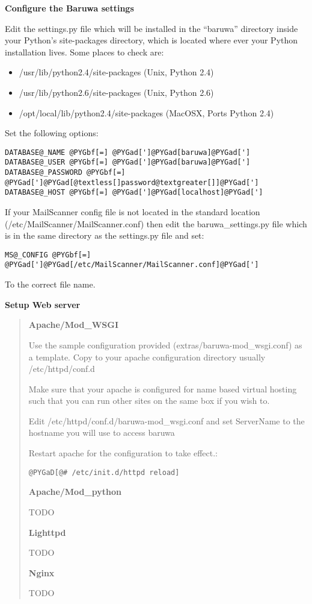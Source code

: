 \documentclass[a4paper,10pt,english]{manual}
\begin{document}
\textbf{Configure the Baruwa settings}

Edit the settings.py file which will be installed in the ``baruwa''
directory inside your Python's site-packages directory, which is
located where ever your Python installation lives. Some places
to check are:
\begin{itemize}
\item {} 
/usr/lib/python2.4/site-packages (Unix, Python 2.4)

\item {} 
/usr/lib/python2.6/site-packages (Unix, Python 2.6)

\item {} 
/opt/local/lib/python2.4/site-packages (MacOSX, Ports Python 2.4)

\end{itemize}

Set the following options:

\begin{Verbatim}[commandchars=@\[\]]
DATABASE@_NAME @PYGbf[=] @PYGad[']@PYGad[baruwa]@PYGad[']
DATABASE@_USER @PYGbf[=] @PYGad[']@PYGad[baruwa]@PYGad[']
DATABASE@_PASSWORD @PYGbf[=] @PYGad[']@PYGad[@textless[]password@textgreater[]]@PYGad[']
DATABASE@_HOST @PYGbf[=] @PYGad[']@PYGad[localhost]@PYGad[']
\end{Verbatim}

If your MailScanner config file is not located in the standard
location (/etc/MailScanner/MailScanner.conf) then edit the
baruwa\_settings.py file which is in the same directory as the
settings.py file and set:

\begin{Verbatim}[commandchars=@\[\]]
MS@_CONFIG @PYGbf[=] @PYGad[']@PYGad[/etc/MailScanner/MailScanner.conf]@PYGad[']
\end{Verbatim}

To the correct file name.

\textbf{Setup Web server}
\begin{quote}

\textbf{Apache/Mod\_WSGI}

Use the sample configuration provided (extras/baruwa-mod\_wsgi.conf)
as a template. Copy to your apache configuration directory usually
/etc/httpd/conf.d

Make sure that your apache is configured for name based virtual
hosting such that you can run other sites on the same box if you
wish to.

Edit /etc/httpd/conf.d/baruwa-mod\_wsgi.conf and set ServerName to
the hostname you will use to access baruwa

Restart apache for the configuration to take effect.:

\begin{Verbatim}[commandchars=@\[\]]
@PYGaD[@# /etc/init.d/httpd reload]
\end{Verbatim}

\textbf{Apache/Mod\_python}

TODO

\textbf{Lighttpd}

TODO

\textbf{Nginx}

TODO
\end{quote}
\end{document}
